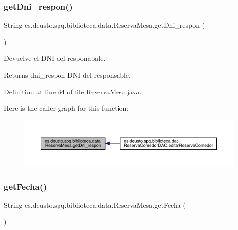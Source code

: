 \subsubsection{\texorpdfstring{get\+Dni\+\_\+respon()}{getDni\_respon()}}
{\footnotesize\ttfamily String es.\+deusto.\+spq.\+biblioteca.\+data.\+Reserva\+Mesa.\+get\+Dni\+\_\+respon (\begin{DoxyParamCaption}{ }\end{DoxyParamCaption})}

Devuelve el D\+NI del responabale. \begin{DoxyReturn}{Returns}
dni\+\_\+respon D\+NI del responsable. 
\end{DoxyReturn}


Definition at line 84 of file Reserva\+Mesa.\+java.

Here is the caller graph for this function\+:
\nopagebreak
\begin{figure}[H]
\begin{center}
\leavevmode
\includegraphics[width=350pt]{classes_1_1deusto_1_1spq_1_1biblioteca_1_1data_1_1_reserva_mesa_a538bc5d954523e684dbf1d048d422927_icgraph}
\end{center}
\end{figure}
\mbox{\label{classes_1_1deusto_1_1spq_1_1biblioteca_1_1data_1_1_reserva_mesa_a291c8790dad8c2c10954cd7731d636b9}} 
\subsubsection{\texorpdfstring{get\+Fecha()}{getFecha()}}
{\footnotesize\ttfamily String es.\+deusto.\+spq.\+biblioteca.\+data.\+Reserva\+Mesa.\+get\+Fecha (\begin{DoxyParamCaption}{ }\end{DoxyParamCaption})}

